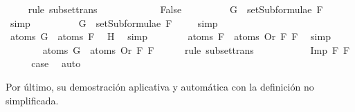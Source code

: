 \begin{isabellebody}
\ {}\ {}\ \isamarkupfalse%
\ {\isacharparenleft}rule\ subset{\isacharunderscore}trans{\isacharparenright}\isanewline
\ \ \ \ \isamarkupfalse%
\isanewline
\ \ \ \ \ \ \isamarkupfalse%
\ False\isanewline
\ \ \ \ \ \ \isamarkupfalse%
\ \isamarkupfalse%
\ {\isachardoublequoteopen}G\ {\isasymnotin}\ setSubformulae\ F{}{\isachardoublequoteclose}\ \isamarkupfalse%
\ simp\isanewline
\ \ \ \ \ \ \isamarkupfalse%
\ \isamarkupfalse%
\ {\isachardoublequoteopen}G\ {\isasymin}\ setSubformulae\ F{}{\isachardoublequoteclose}\ \isamarkupfalse%
\ {}\ \isamarkupfalse%
\ simp\isanewline
\ \ \ \ \ \ \isamarkupfalse%
\ \isamarkupfalse%
\ {}{\isacharcolon}{\isachardoublequoteopen}atoms\ G\ {\isasymsubseteq}\ atoms\ F{}{\isachardoublequoteclose}\ \isamarkupfalse%
\ H{}\ \isamarkupfalse%
\ simp\isanewline
\ \ \ \ \ \ \isamarkupfalse%
\ {}{\isacharcolon}{\isachardoublequoteopen}atoms\ F{}\ {\isasymsubseteq}\ atoms\ {\isacharparenleft}Or\ F{}\ F{}{\isacharparenright}{\isachardoublequoteclose}\ \isamarkupfalse%
\ simp\isanewline
\ \ \ \ \ \ \isamarkupfalse%
\ {\isachardoublequoteopen}atoms\ G\ {\isasymsubseteq}\ atoms\ {\isacharparenleft}Or\ F{}\ F{}{\isacharparenright}{\isachardoublequoteclose}\ \isamarkupfalse%
\ {}\ {}\ \isamarkupfalse%
\ {\isacharparenleft}rule\ subset{\isacharunderscore}trans{\isacharparenright}\isanewline
\ \ \ \ \isamarkupfalse%
\isanewline
\ \ \isamarkupfalse%
\isanewline
{}\isamarkupfalse%
\isanewline
\ \ \isamarkupfalse%
\ {\isacharparenleft}Imp\ F{}\ F{}{\isacharparenright}\isanewline
\ \ \isamarkupfalse%
\ \isamarkupfalse%
\ {\isacharquery}case\ \isamarkupfalse%
\ auto\isanewline
{}\isamarkupfalse%
%
\endisatagproof
{\isafoldproof}%
%
\isadelimproof
%
\endisadelimproof
%
\begin{isamarkuptext}%
Por último, su demostración aplicativa y automática con la definición no simplificada.%
\end{isamarkuptext}\isamarkuptrue%
\isamarkupfalse%

\end{isabellebody}
